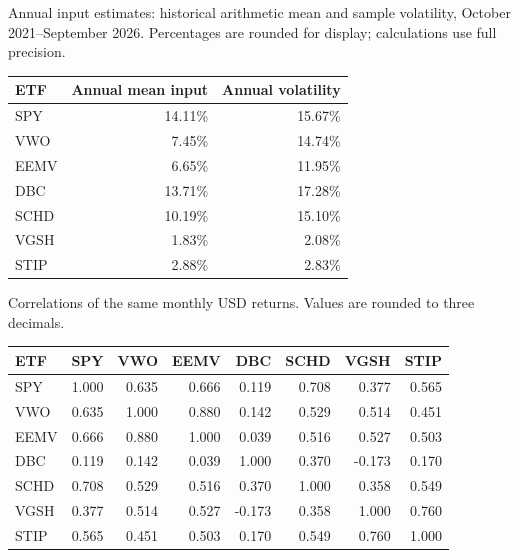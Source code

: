 \documentclass[10pt,a4paper]{article}
\begin{document}
Annual input estimates: historical arithmetic mean and sample volatility, October 2021--September 2026. Percentages are rounded for display; calculations use full precision.


\begin{center}\footnotesize
\begin{tabular}{@{}lrr@{}}\toprule
ETF & Annual mean input & Annual volatility\\
\midrule
SPY & 14.11\% & 15.67\%\\
VWO & 7.45\% & 14.74\%\\
EEMV & 6.65\% & 11.95\%\\
DBC & 13.71\% & 17.28\%\\
SCHD & 10.19\% & 15.10\%\\
VGSH & 1.83\% & 2.08\%\\
STIP & 2.88\% & 2.83\%\\
\bottomrule\end{tabular}\end{center}

Correlations of the same monthly USD returns. Values are rounded to three decimals.


\begin{center}\footnotesize
\begin{tabular}{@{}lrrrrrrr@{}}\toprule
ETF & SPY & VWO & EEMV & DBC & SCHD & VGSH & STIP\\
\midrule
SPY & 1.000 & 0.635 & 0.666 & 0.119 & 0.708 & 0.377 & 0.565\\
VWO & 0.635 & 1.000 & 0.880 & 0.142 & 0.529 & 0.514 & 0.451\\
EEMV & 0.666 & 0.880 & 1.000 & 0.039 & 0.516 & 0.527 & 0.503\\
DBC & 0.119 & 0.142 & 0.039 & 1.000 & 0.370 & -0.173 & 0.170\\
SCHD & 0.708 & 0.529 & 0.516 & 0.370 & 1.000 & 0.358 & 0.549\\
VGSH & 0.377 & 0.514 & 0.527 & -0.173 & 0.358 & 1.000 & 0.760\\
STIP & 0.565 & 0.451 & 0.503 & 0.170 & 0.549 & 0.760 & 1.000\\
\bottomrule\end{tabular}\end{center}
\end{document}
